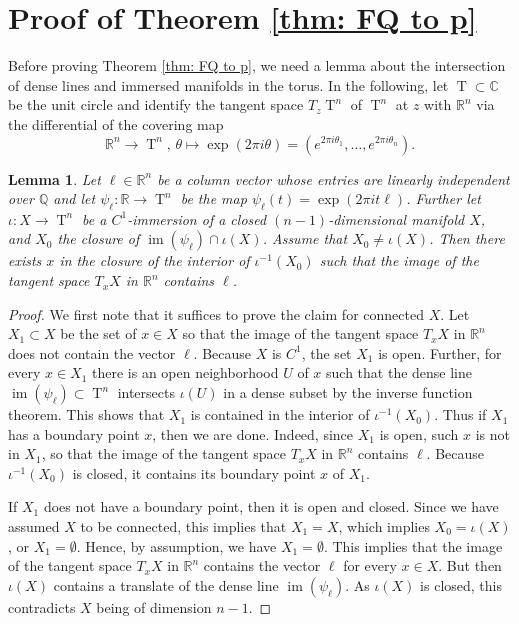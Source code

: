 \documentclass[11pt,letterpaper]{amsart}
\theoremstyle{definition}
\theoremstyle{plain}
\newtheorem{lem}[Def]{Lemma}
\newcommand{\im}{\operatorname{im}}
\newcommand{\T}{\operatorname{T}}
\newcommand{\C}{{\mathbb C}}
\newcommand{\R}{{\mathbb R}}
\newcommand{\Q}{{\mathbb Q}}
\begin{document}
\section{Proof of Theorem \ref{thm: FQ to p}}\label{sec: proof of FQ to p}
Before proving Theorem \ref{thm: FQ to p}, we need a lemma about the intersection of dense lines and immersed manifolds in the torus.
In the following, let $\T\subset\C$ be the unit circle and identify the tangent space $T_z\T^n$ of $\T^n$ at $z$ with $\R^n$ via the differential of the covering map
    \begin{equation*}
        \R^n\to\T^n,\,\theta\mapsto\exp(2\pi i\theta)=(e^{2\pi i \theta_{1}},\ldots,e^{2\pi i \theta_{n}}).
    \end{equation*}

\begin{lem}\label{lem:linedense1}
    Let $\ell\in\R^n$ be a column vector whose entries are linearly independent over $\Q$ and let $\psi_\ell\colon\R\to\T^n$ be the map $\psi_{\ell}(t)=\exp(2\pi i t\ell)$. Further let $\iota\colon X\to\T^n$ be a $C^1$-immersion of a closed $(n-1)$-dimensional manifold $X$, and $X_0$ the closure of $\im(\psi_\ell)\cap \iota(X)$. Assume that $X_0\neq\iota(X)$. Then there exists $x$ in the closure of the interior of $\iota^{-1}(X_0)$ such that the image of the tangent space ${T}_xX$ in $\R^n$ contains $\ell$.
\end{lem}
\begin{proof}
    We first note that it suffices to prove the claim for connected $X$. Let $X_1\subset X$ be the set of $x\in X$ so that the image of the tangent space ${T}_xX$ in $\R^n$ does not contain the vector $\ell$. Because $X$ is $C^1$, the set $X_1$ is open. Further, for every $x\in X_1$ there is an open neighborhood $U$ of $x$ such that the dense line $\im(\psi_\ell)\subset\T^n$ intersects $\iota(U)$ in a dense subset by the inverse function theorem. 
    This shows that $X_1$ is contained in the interior of $\iota^{-1}(X_0)$.
    Thus if $X_1$ has a boundary point $x$, then we are done. Indeed, since $X_1$ is open, such $x$ is not in $X_1$, so that the image of the tangent space ${T}_xX$ in $\R^n$ contains $\ell$. Because $\iota^{-1}(X_0)$ is closed, it contains its boundary point $x$ of $X_1$.
    
    If $X_1$ does not have a boundary point, then it is open and closed. Since we have assumed $X$ to be connected, this implies that $X_1=X$, which implies $X_0=\iota(X)$, or $X_1=\emptyset$. Hence, by assumption, we have $X_1=\emptyset$.
    This implies that the image of the tangent space ${T}_xX$ in $\R^n$ contains the vector $\ell$ for every $x\in X$. But then $\iota(X)$ contains a translate of the dense line $\im(\psi_\ell)$. As $\iota(X)$ is closed, this contradicts $X$ being of dimension $n-1$.
\end{proof}
\end{document}
